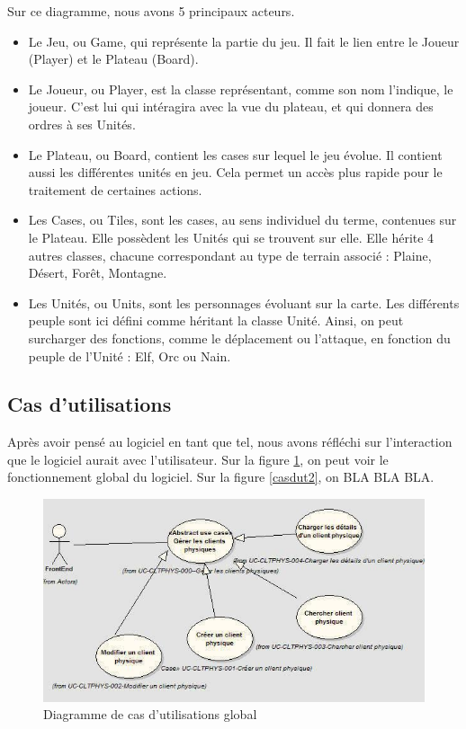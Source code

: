 \documentclass[12pt]{article}
\begin{document}
Sur ce diagramme, nous avons 5 principaux acteurs.
\begin{itemize}
  \item Le Jeu, ou Game, qui représente la partie du jeu. Il fait le lien entre le Joueur (Player) et le Plateau (Board). 
  \item Le Joueur, ou Player, est la classe représentant, comme son nom l'indique, le joueur. C'est lui qui intéragira avec la vue du plateau, et qui donnera des ordres à ses Unités.
  \item Le Plateau, ou Board, contient les cases sur lequel le jeu évolue. Il contient aussi les différentes unités en jeu. Cela permet un accès plus rapide pour le traitement de certaines actions.
  \item Les Cases, ou Tiles, sont les cases, au sens individuel du terme, contenues sur le Plateau. Elle possèdent les Unités qui se trouvent sur elle. Elle hérite 4 autres classes, chacune correspondant au type de terrain associé : Plaine, Désert, Forêt, Montagne.
  \item Les Unités, ou Units, sont les personnages évoluant sur la carte. Les différents peuple sont ici défini comme héritant la classe Unité. Ainsi, on peut surcharger des fonctions, comme le déplacement ou l'attaque, en fonction du peuple de l'Unité : Elf, Orc ou Nain.
\end{itemize}

\subsection{Cas d'utilisations}
Après avoir pensé au logiciel en tant que tel, nous avons réfléchi sur l'interaction que le logiciel aurait avec l'utilisateur. Sur la figure \ref{casdut1}, on peut voir le fonctionnement global du logiciel. Sur la figure \ref{casdut2}, on BLA BLA BLA.

\begin{figure}[!h] 
\centerline{\includegraphics[scale=0.60]{img/diag_cas_dut_ex.jpeg}}
   \caption{\label{étiquette} Diagramme de cas d'utilisations global}
\label{casdut1}
\end{figure}
\end{document}
